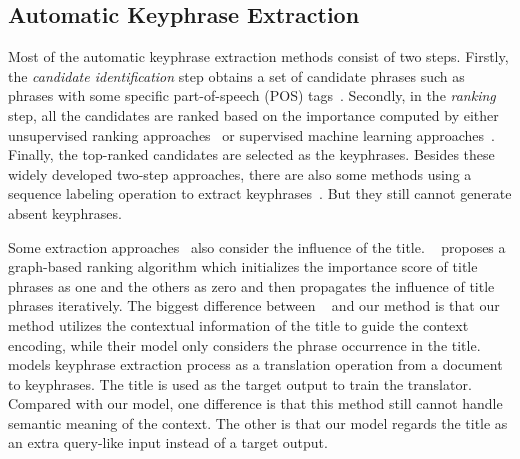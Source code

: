 \documentclass[letterpaper]{article} %
\begin{document}
\subsection{Automatic Keyphrase Extraction}
Most of the automatic keyphrase extraction methods consist of two steps. Firstly, the \textit{candidate identification} step obtains a set of candidate phrases such as phrases with some specific part-of-speech (POS) tags~\cite{medelyan2009human,witten1999kea}. Secondly, in the \textit{ranking} step, all the candidates are ranked based on the importance computed by either unsupervised ranking approaches~\cite{wan2008single,mihalcea2004textrank,aaai_FlorescuC17_unsupervised} or supervised machine learning approaches~\cite{medelyan2009human,witten1999kea,nguyen2010wingnus_title,aaai_FlorescuJ18_supervised}. Finally, the top-ranked candidates are selected as the keyphrases. Besides these widely developed two-step approaches, there are also some methods using a sequence labeling operation to extract keyphrases~\cite{zhang2016keyphrase_twitter,luan2017scientific_seq_labeling,aaai_GollapalliLY17_seqlabel}. But they still cannot generate absent keyphrases.


Some extraction approaches~\cite{li2010semi_title,liu2011automatic_title} also consider the influence of the title. \citeauthor{li2010semi_title}~ proposes a graph-based ranking algorithm which initializes the importance score of title phrases as one and the others as zero and then propagates the influence of title phrases iteratively. The biggest difference between \citeauthor{li2010semi_title}~ and our method is that our method utilizes the contextual information of the title to guide the context encoding, while their model only considers the phrase occurrence in the title. \citeauthor{liu2011automatic_title}~ models keyphrase extraction process as a translation operation from a document to keyphrases. The title is used as the target output to train the translator. Compared with our model, one difference is that this method still cannot handle semantic meaning of the context. The other is that our model regards the title as an extra query-like input instead of a target output.
\end{document}

